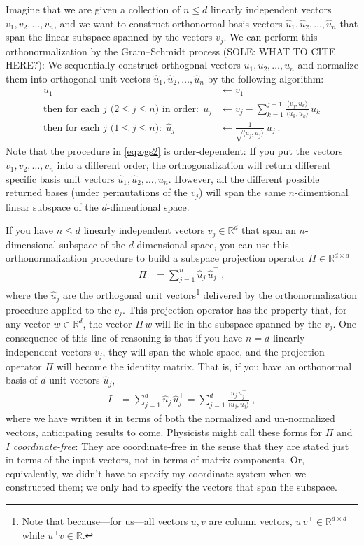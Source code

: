 \documentclass{article}
\newcommand{\inner}[2]{\langle{#1},{#2}\rangle}
\begin{document}
Imagine that we are given a collection of $n\leq d$ linearly independent vectors $v_1,v_2,\ldots,v_n$,
and we want to construct orthonormal basis vectors $\hat{u}_1,\hat{u}_2,\ldots,\hat{u}_n$ that span the linear subspace spanned by the vectors $v_j$.
We can perform this orthonormalization by the Gram--Schmidt process (SOLE: WHAT TO CITE HERE?):
We sequentially construct orthogonal vectors $u_1,u_2,\ldots,u_n$ and normalize them into orthogonal unit vectors $\hat{u}_1,\hat{u}_2,\ldots,\hat{u}_n$ by the following algorithm:
\begin{align}
    u_1 &\leftarrow v_1 \label{eq:ogs1}
    \\
    \mbox{then for each $j$ ($2\leq j\leq n$) in order:} ~~ u_j &\leftarrow v_j - \sum_{k=1}^{j-1} \frac{\inner{v_j}{u_k}}{\inner{u_k}{u_k}}\,u_k \label{eq:ogs2}
    \\
    \mbox{then for each $j$ ($1\leq j\leq n$):} ~~ \hat{u}_j &\leftarrow \frac{1}{\sqrt{\inner{u_j}{u_j}}}\,u_j ~. \label{eq:ogs3}
\end{align}
Note that the procedure in \eqref{eq:ogs2} is order-dependent: If you put the vectors $v_1,v_2,\ldots,v_n$ into a different order, the orthogonalization will return different specific basis unit vectors $\hat{u}_1,\hat{u}_2,\ldots,\hat{u}_n$.
However, all the different possible returned bases (under permutations of the $v_j$) will span the same $n$-dimentional linear subspace of the $d$-dimentional space.

If you have $n\leq d$ linearly independent vectors $v_j\in\mathbb{R}^d$ that span an $n$-dimensional subspace of the $d$-dimensional space, you can use this orthonormalization procedure to build a subspace projection operator $\Pi\in\mathbb{R}^{d\times d}$
\begin{align}\label{eq:oproj}
    \Pi &= \sum_{j=1}^n \hat{u}_j\,\hat{u}_j^\top ~,
\end{align}
where the $\hat{u}_j$ are the orthogonal unit vectors\footnote{Note that because---for us---all vectors $u,v$ are column vectors, $u\,v^\top\in\mathbb{R}^{d\times d}$ while $u^\top v\in\mathbb{R}$.} delivered by the orthonormalization procedure applied to the $v_j$.
This projection operator has the property that, for any vector $w\in\mathbb{R}^d$, the vector $\Pi\,w$ will lie in the subspace spanned by the $v_j$.
One consequence of this line of reasoning is that if you have $n=d$ linearly independent vectors $v_j$, they will span the whole space, and the projection operator $\Pi$ will become the identity matrix.
That is, if you have an orthonormal basis of $d$ unit vectors $\hat{u}_j$,
\begin{align}\label{eq:oI}
    I &= \sum_{j=1}^d \hat{u}_j\,\hat{u}_j^\top = \sum_{j=1}^d \frac{u_j\,u_j^\top}{\inner{u_j}{u_j}} ~,
\end{align}
where we have written it in terms of both the normalized and un-normalized vectors, anticipating results to come.
Physicists might call these forms for $\Pi$ and $I$ \emph{coordinate-free}:
They are coordinate-free in the sense that they are stated just in terms of the input vectors, not in terms of matrix components.
Or, equivalently, we didn't have to specify my coordinate system when we constructed them; we only had to specify the vectors that span the subspace.
\end{document}
